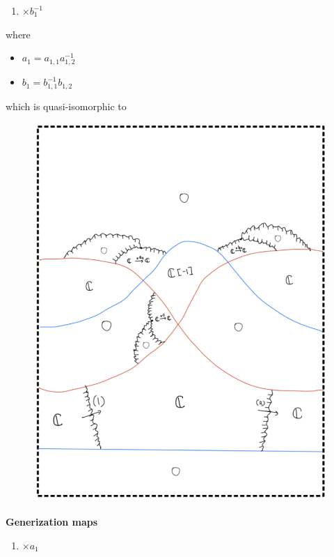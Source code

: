 \begin{enumerate}[label = (\roman*)]
\begin{enumerate}[label = (Step \arabic*)]
\begin{enumerate}[label = (\arabic*)]
\item $\times b_1^{-1}$
\end{enumerate}
where
\begin{itemize}
\item $a_1 = a_{1,1}a_{1,2}^{-1}$
\item $b_1 = b_{1,1}^{-1}b_{1,2}$
\end{itemize}
\pagebreak
which is quasi-isomorphic to
\begin{figure}[H]
    \centering
    \includegraphics[scale = 0.95]{diagrams/cobord_gen/base_4.png}
    \caption{}
    \label{fig:your-label}
\end{figure}
\textbf{Generization maps}
\begin{enumerate}[label = (\arabic*)]
\item $\times a_1$


\end{enumerate}
\end{enumerate}
\end{enumerate}
